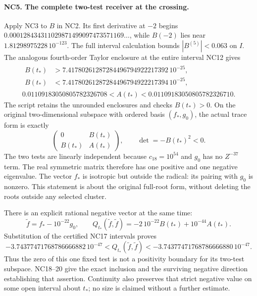 \paragraph{NC5. The complete two-test receiver at the crossing.}
Apply NC3 to $B$ in NC2. Its first derivative at $-2$ begins
$0.000128434311029871499097473571169\ldots$, while
$B(-2)$ lies near $1.81298975228\,10^{-123}$.
The full interval calculation bounds $|B^{(5)}|<0.063$ on $I$.
The analogous fourth-order Taylor enclosure at the entire interval
NC12 gives
\[
\begin{gathered}
\begin{aligned}
B(t_*)&>7.41780261287284496794922217392\,10^{-25},\\
B(t_*)&<7.41780261287284496794922217394\,10^{-25},
\end{aligned}\\
0.01109183050805782326708<A(t_*)<0.01109183050805782326710.
\end{gathered}\tag{NC17}
\]
The script retains the unrounded enclosures and checks $B(t_*)>0$.
On the original two-dimensional subspace with ordered basis
$(f_*,g_0)$, the actual trace form is exactly
\[
 \begin{pmatrix}0&B(t_*)\\B(t_*)&A(t_*)\end{pmatrix},
 \qquad\det=-B(t_*)^2<0.
 \tag{NC18}
\]
The two tests are linearly independent because $c_{18}=10^{54}$
and $g_0$ has no $Z^{-37}$ term. The real symmetric matrix therefore
has one positive and one negative eigenvalue. The vector $f_*$ is
isotropic but outside the radical: its pairing with $g_0$ is nonzero.
This statement is about the original full-root form, without deleting
the roots outside any selected cluster.

There is an explicit rational negative vector at the same time:
\[
 \widetilde f=f_*-10^{-22}g_0,
 \qquad
 Q_{t_*}(\widetilde f,\widetilde f)
 =-2\,10^{-22}B(t_*)+10^{-44}A(t_*).
 \tag{NC19}
\]
Substitution of the certified NC17 intervals proves
\[
 -3.74377471768786666882\,10^{-47}
 <Q_{t_*}(\widetilde f,\widetilde f)
 <-3.74377471768786666880\,10^{-47}.
 \tag{NC20}
\]
Thus the zero of this one fixed test is not a positivity boundary
for its two-test subspace. NC18--20 give the exact inclusion and
the surviving negative direction establishing that assertion.
Continuity also preserves that strict negative value on some open
interval about $t_*$; no size is claimed without a further estimate.


